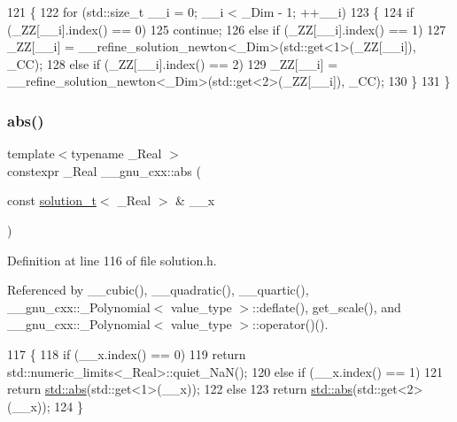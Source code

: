 \begin{DoxyCode}
121     \{
122       \textcolor{keywordflow}{for} (std::size\_t \_\_i = 0; \_\_i < \_Dim - 1; ++\_\_i)
123         \{
124           \textcolor{keywordflow}{if} (\_ZZ[\_\_i].index() == 0)
125             \textcolor{keywordflow}{continue};
126           \textcolor{keywordflow}{else} \textcolor{keywordflow}{if} (\_ZZ[\_\_i].index() == 1)
127             \_ZZ[\_\_i] = \_\_refine\_solution\_newton<\_Dim>(std::get<1>(\_ZZ[\_\_i]), \_CC);
128           \textcolor{keywordflow}{else} \textcolor{keywordflow}{if} (\_ZZ[\_\_i].index() == 2)
129             \_ZZ[\_\_i] = \_\_refine\_solution\_newton<\_Dim>(std::get<2>(\_ZZ[\_\_i]), \_CC);
130         \}
131     \}
\end{DoxyCode}
\mbox{\label{namespace____gnu__cxx_ab9eb9db3560f504f8cd25a71bcb6ead5}} 
\subsubsection{\texorpdfstring{abs()}{abs()}}
{\footnotesize\ttfamily template$<$typename \+\_\+\+Real $>$ \\
constexpr \+\_\+\+Real \+\_\+\+\_\+gnu\+\_\+cxx\+::abs (\begin{DoxyParamCaption}\item[{const \hyperlink{namespace____gnu__cxx_ae20ea642de50eb361074c62676b0159c}{solution\+\_\+t}$<$ \+\_\+\+Real $>$ \&}]{\+\_\+\+\_\+x }\end{DoxyParamCaption})}



Definition at line 116 of file solution.\+h.



Referenced by \+\_\+\+\_\+cubic(), \+\_\+\+\_\+quadratic(), \+\_\+\+\_\+quartic(), \+\_\+\+\_\+gnu\+\_\+cxx\+::\+\_\+\+Polynomial$<$ value\+\_\+type $>$\+::deflate(), get\+\_\+scale(), and \+\_\+\+\_\+gnu\+\_\+cxx\+::\+\_\+\+Polynomial$<$ value\+\_\+type $>$\+::operator()().


\begin{DoxyCode}
117     \{
118       \textcolor{keywordflow}{if} (\_\_x.index() == 0)
119         \textcolor{keywordflow}{return} std::numeric\_limits<\_Real>::quiet\_NaN();
120       \textcolor{keywordflow}{else} \textcolor{keywordflow}{if} (\_\_x.index() == 1)
121         \textcolor{keywordflow}{return} \hyperlink{namespace____gnu__cxx_ab9eb9db3560f504f8cd25a71bcb6ead5}{std::abs}(std::get<1>(\_\_x));
122       \textcolor{keywordflow}{else}
123         \textcolor{keywordflow}{return} \hyperlink{namespace____gnu__cxx_ab9eb9db3560f504f8cd25a71bcb6ead5}{std::abs}(std::get<2>(\_\_x));
124     \}
\end{DoxyCode}
\mbox{\label{namespace____gnu__cxx_a33c585ec7ce2ac87e7f5cb1b1fe403b1}} 
